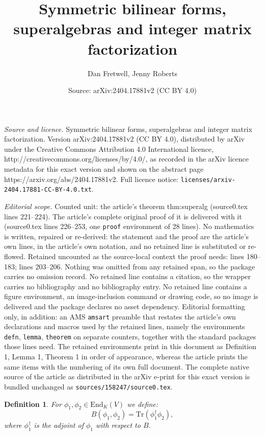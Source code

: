 \documentclass[10pt,a4paper]{amsart}
\title{Symmetric bilinear forms, superalgebras and integer matrix factorization}
\author{Dan Fretwell, Jenny Roberts}
\date{Source: arXiv:2404.17881v2 (CC BY 4.0)}
\newtheorem{defn}{Definition}
\begin{document}
\maketitle

\noindent\emph{Source and licence.} Symmetric bilinear forms, superalgebras and integer matrix factorization. Version arXiv:2404.17881v2 (CC BY 4.0), distributed by arXiv under the Creative Commons Attribution 4.0 International licence, http://creativecommons.org/licenses/by/4.0/, as recorded in the arXiv licence metadata for this exact version and shown on the abstract page https://arxiv.org/abs/2404.17881v2. Full licence notice: \texttt{licenses/arxiv-2404.17881-CC-BY-4.0.txt}.\par\smallskip

\noindent\textit{Editorial scope.} Counted unit: the article's theorem thm:superalg (source0.tex lines 221--224). The article's complete original proof of it is delivered with it (source0.tex lines 226--253, one \texttt{proof} environment of 28 lines). No mathematics is written, repaired or re-derived: the statement and the proof are the article's own lines, in the article's own notation, and no retained line is substituted or re-flowed.  Retained uncounted as the source-local context the proof needs: lines 180--183; lines 203--206.  Nothing was omitted from any retained span, so the package carries no omission record.  No retained line contains a citation, so the wrapper carries no bibliography and no bibliography entry.  No retained line contains a figure environment, an image-inclusion command or drawing code, so no image is delivered and the package declares no asset dependency.  Editorial formatting only, in addition: an AMS \texttt{amsart} preamble that restates the article's own declarations and macros used by the retained lines, namely the environments \texttt{defn}, \texttt{lemma}, \texttt{theorem} on separate counters, together with the standard packages those lines need.  The retained environments print in this document as Definition 1, Lemma 1, Theorem 1 in order of appearance, whereas the article prints the same items with the numbering of its own full document.  The complete native source of the article as distributed in the arXiv e-print for this exact version is bundled unchanged as \texttt{sources/158247/source0.tex}.
\begin{defn}
\label{def:bfend}
For $\phi_1, \phi_2\in\text{End}_K(V)$ we define: \[B(\phi_1, \phi_2) = \text{Tr}(\phi_1^\dagger\phi_2),\] where $\phi_1^{\dagger}$ is the adjoint of $\phi_1$ with respect to $B$.
\end{defn}
\end{document}
